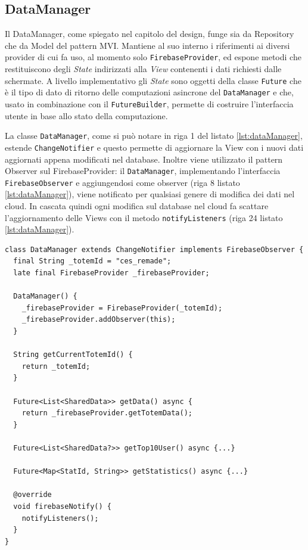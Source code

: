 \subsection{DataManager}
Il DataManager, come spiegato nel capitolo del design, funge sia da Repository che da Model del pattern MVI. Mantiene al suo interno i riferimenti ai diversi provider di cui fa uso, al momento solo \texttt{FirebaseProvider}, ed espone metodi che restituiscono degli \textit{State} indirizzati alla \textit{View} contenenti i dati richiesti dalle schermate. A livello implementativo gli \textit{State} sono oggetti della classe \texttt{Future} che è il tipo di dato di ritorno delle computazioni asincrone del \texttt{DataManager} e che, usato in combinazione con il \texttt{FutureBuilder}, permette di costruire l'interfaccia utente in base allo stato della computazione.

La classe \texttt{DataManager}, come si può notare in riga 1 del listato \ref{lst:dataManager}, estende \texttt{ChangeNotifier} e questo permette di aggiornare la View con i nuovi dati aggiornati appena modificati nel database.
Inoltre viene utilizzato il pattern Observer sul FirebaseProvider: il \texttt{DataManager}, implementando l'interfaccia \texttt{FirebaseObserver} e aggiungendosi come observer (riga 8 listato \ref{lst:dataManager}), viene notificato per qualsiasi genere di modifica dei dati nel cloud.
In cascata quindi ogni modifica sul database nel cloud fa scattare l'aggiornamento delle Views con il metodo \texttt{notifyListeners} (riga 24 listato \ref{lst:dataManager}).
\vspace{\baselineskip}
\begin{lstlisting}[style=FlutterStyle, caption={Classe DataManager}, label={lst:dataManager}]
class DataManager extends ChangeNotifier implements FirebaseObserver {
  final String _totemId = "ces_remade";
  late final FirebaseProvider _firebaseProvider;

  DataManager() {
    _firebaseProvider = FirebaseProvider(_totemId);
    _firebaseProvider.addObserver(this);
  }

  String getCurrentTotemId() {
    return _totemId;
  }

  Future<List<SharedData>> getData() async {
    return _firebaseProvider.getTotemData();
  }

  Future<List<SharedData?>> getTop10User() async {...}

  Future<Map<StatId, String>> getStatistics() async {...}

  @override
  void firebaseNotify() {
    notifyListeners(); 
  }
}
\end{lstlisting}

